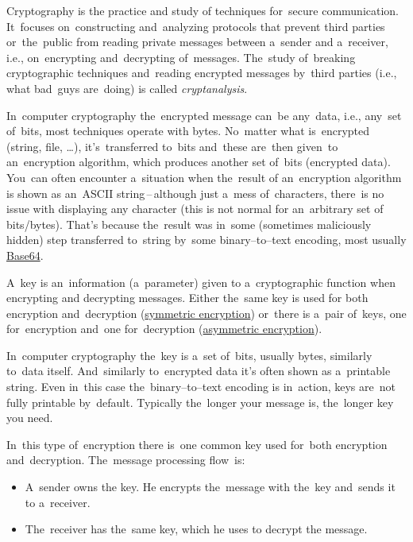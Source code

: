 Cryptography is the practice and study of techniques for~secure communication. It~focuses on~constructing and~analyzing protocols that prevent third parties or~the~public from reading private messages between a~sender and a~receiver, i.e., on~encrypting and~decrypting of~messages. The~study of~breaking cryptographic techniques and~reading encrypted messages by~third parties (i.e., what bad~guys are~doing) is called \textit{cryptanalysis}.

In~computer cryptography the~encrypted message can~be any~data, i.e., any~set of~bits, most techniques operate with bytes. No~matter what is~encrypted (string, file, \dots), it's~transferred to~bits and~these are~then given~to an~encryption algorithm, which produces another set of~bits (encrypted data). You~can often encounter a~situation when the~result of an~encryption algorithm is shown as an~ASCII string\,--\,although just a~mess of~characters, there~is no issue with displaying any character (this is not normal for an~arbitrary set of bits/bytes). That's because the~result was in~some (sometimes maliciously hidden) step transferred to~string by~some binary--to--text encoding, most usually \hyperref[base64]{Base64}.

A~key is an~information (a~parameter) given to a~cryptographic function when encrypting and decrypting messages. Either the~same key is used for both encryption and~decryption (\hyperref[symmetricencryption]{symmetric encryption}) or~there is a~pair of~keys, one for~encryption and~one for~decryption (\hyperref[asymmetricencryption]{asymmetric encryption}).

In~computer cryptography the~key is a~set of~bits, usually bytes, similarly to~data itself. And~similarly to~encrypted data it's often shown as a~printable string. Even in~this case the~binary--to--text encoding is in~action, keys are~not fully printable by~default. Typically the~longer your message is, the~longer key you need.

\label{symmetricencryption}
In~this type of~encryption there is~one common key used for~both encryption and~decryption. The~message processing flow~is:
\begin{itemize}
    \item A~sender owns the key. He encrypts the~message with the~key and~sends it to a~receiver.
    \item The~receiver has the~same key, which he uses to decrypt the message.
\end{itemize}

